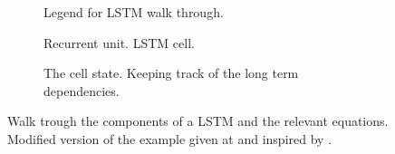 \begin{figure*}[hp]
        \centering
        \begin{subfigure}[b]{\textwidth}   
            \centering 
            
            \caption{Legend for LSTM walk through.}
            \label{fig:legend_lstm}
        \end{subfigure}

        \begin{subfigure}[b]{0.475\textwidth}
            \centering
            
            \caption[Channel WV 6.2]
            {{\small Recurrent unit. LSTM cell.}}
                
            \label{fig:lstm_unit}
        \end{subfigure}
        \hfill
        \begin{subfigure}[b]{0.475\textwidth}  
            \centering 
            
            \caption[]%
            {{\small The cell state. Keeping track of the long term dependencies.}}    
            \label{fig:cell_state_information_flow}
        \end{subfigure}

        \caption{Walk trough the components of a LSTM and the relevant equations.  Modified version of the example given at \cite{lstm_cell_tikz} and inspired by \cite{colah_blog_post}.
        }
        \label{fig:LSTM2}
    \end{figure*}